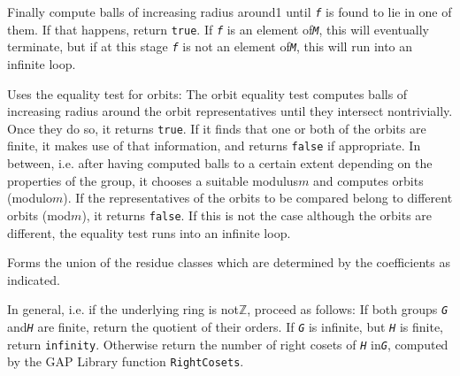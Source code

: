 \documentclass[a4paper,11pt]{report}
\begin{document}
{\begin{description}
 Finally compute balls of increasing radius around{\nobreakspace}1 until \mbox{\texttt{\mdseries\slshape f}} is found to lie in one of them. If that happens, return \texttt{true}. If \mbox{\texttt{\mdseries\slshape f}} is an element of{\nobreakspace}\mbox{\texttt{\mdseries\slshape M}}, this will eventually terminate, but if at this stage \mbox{\texttt{\mdseries\slshape f}} is not an element of{\nobreakspace}\mbox{\texttt{\mdseries\slshape M}}, this will run into an infinite loop. 
\item[{ \texttt{\mbox{\texttt{\mdseries\slshape point}} in \mbox{\texttt{\mdseries\slshape orbit}}} (membership test for orbits) }]  Uses the equality test for orbits: The orbit equality test computes balls of
increasing radius around the orbit representatives until they intersect
non\texttt{}trivially. Once they do so, it returns \texttt{true}. If it finds that one or both of the orbits are finite, it makes use of that
information, and returns \texttt{false} if appropriate. In between, i.e. after having computed balls to a certain
extent depending on the properties of the group, it chooses a suitable
modulus{\nobreakspace}$m$ and computes orbits (modulo{\nobreakspace}$m$). If the representatives of the orbits to be compared belong to different
orbits (mod{\nobreakspace}$m$), it returns \texttt{false}. If this is not the case although the orbits are different, the equality test
runs into an infinite loop. 
\item[{ \texttt{IncreasingOn(\mbox{\texttt{\mdseries\slshape f}})} }]  Forms the union of the residue classes which are determined by the
coefficients as indicated. 
\item[{ \texttt{Index(\mbox{\texttt{\mdseries\slshape G}},\mbox{\texttt{\mdseries\slshape H}})} }]  In general, i.e. if the underlying ring is
not{\nobreakspace}{\ensuremath{\mathbb Z}}, proceed as follows: If both groups \mbox{\texttt{\mdseries\slshape G}} and{\nobreakspace}\mbox{\texttt{\mdseries\slshape H}} are finite, return the quotient of their orders. If \mbox{\texttt{\mdseries\slshape G}} is infinite, but \mbox{\texttt{\mdseries\slshape H}} is finite, return \texttt{infinity}. Otherwise return the number of right cosets of \mbox{\texttt{\mdseries\slshape H}} in{\nobreakspace}\mbox{\texttt{\mdseries\slshape G}}, computed by the \textsf{GAP} Library function \texttt{RightCosets}. 


\end{description}}
\end{document}
